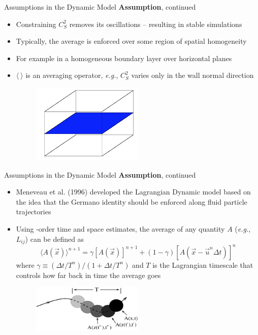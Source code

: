 \begin{frame}{Assumptions in the Dynamic Model}
\textbf{ Assumption}, continued
\begin{itemize}
	\item Constraining $C_S^2$ removes its oscillations -- resulting in stable simulations 
	\item Typically, the average is enforced over some region of spatial homogeneity
	\item For example in a homogeneous boundary layer over horizontal planes
	\item $\langle\ \rangle$ is an averaging operator, \textit{e.g.}, $C_S^2$ varies only in the wall normal direction
	\begin{figure}
		\includegraphics[width=0.5\textwidth]{germano2}
	\end{figure}
\end{itemize}
\end{frame}

\begin{frame}{Assumptions in the Dynamic Model}
\textbf{ Assumption}, continued
\begin{itemize}
	\item Meneveau et al. (1996) developed the Lagrangian Dynamic model based on the idea that the Germano identity should be enforced along fluid particle trajectories
	\item Using -order time and space estimates, the average of any quantity $A$ (\textit{e.g.}, $L_{ij}$) can be defined as
	$$\langle A(\vec{x})\rangle^{n+1} = \gamma\left[A(\vec{x})\right]^{n+1} + (1-\gamma)\left[A(\vec{x}-\vec{u}^n\Delta t)\right]^n$$
	where $\gamma \equiv (\Delta t/T^n) / (1 + \Delta t/T^n)$ and $T$ is the Lagrangian timescale that controls how far back in time the average goes
	\begin{figure}
		\includegraphics[width=0.5\textwidth]{germano3}
	\end{figure}
\end{itemize}
\end{frame}


